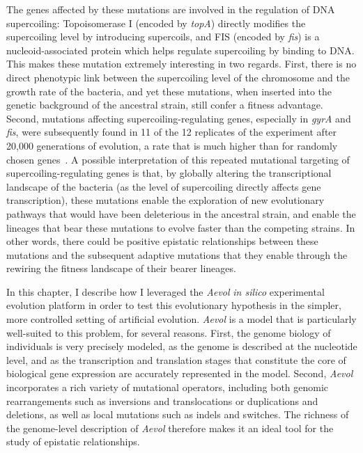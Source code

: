 The genes affected by these mutations are involved in the regulation of DNA supercoiling: Topoisomerase I (encoded by \emph{topA}) directly modifies the supercoiling level by introducing supercoils, and FIS (encoded by \emph{fis}) is a nucleoid-associated protein which helps regulate supercoiling by binding to DNA.
This makes these mutation extremely interesting in two regards.
First, there is no direct phenotypic link between the supercoiling level of the chromosome and the growth rate of the bacteria, and yet these mutations, when inserted into the genetic background of the ancestral strain, still confer a fitness advantage.
Second, mutations affecting supercoiling-regulating genes, especially in \emph{gyrA} and \emph{fis}, were subsequently found in 11 of the 12 replicates of the experiment after 20,000 generations of evolution, a rate that is much higher than for randomly chosen genes~\citep{crozat2010}.
A possible interpretation of this repeated mutational targeting of supercoiling-regulating genes is that, by globally altering the transcriptional landscape of the bacteria (as the level of supercoiling directly affects gene transcription), these mutations enable the exploration of new evolutionary pathways that would have been deleterious in the ancestral strain, and enable the lineages that bear these mutations to evolve faster than the competing strains.
In other words, there could be positive epistatic relationships between these mutations and the subsequent adaptive mutations that they enable through the rewiring the fitness landscape of their bearer lineages.

In this chapter, I describe how I leveraged the \emph{Aevol} \emph{in silico} experimental evolution platform in order to test this evolutionary hypothesis in the simpler, more controlled setting of artificial evolution.
\emph{Aevol} is a model that is particularly well-suited to this problem, for several reasons.
First, the genome biology of individuals is very precisely modeled, as the genome is described at the nucleotide level, and as the transcription and translation stages that constitute the core of biological gene expression are accurately represented in the model.
Second, \emph{Aevol} incorporates a rich variety of mutational operators, including both genomic rearrangements such as inversions and translocations or duplications and deletions, as well as local mutations such as indels and switches.
The richness of the genome-level description of \emph{Aevol} therefore makes it an ideal tool for the study of epistatic relationships.

